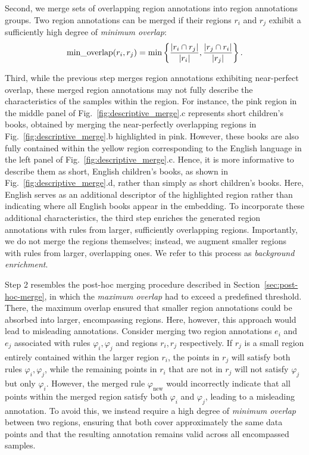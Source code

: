 \documentclass[lettersize,journal]{IEEEtran}
\begin{document}
Second, we merge sets of overlapping region annotations into region annotations groups.
Two region annotations can be merged if their regions $r_i$ and $r_j$ exhibit a sufficiently high degree of \textit{minimum overlap}:
\begin{equation}
\text{min\_overlap}(r_i, r_j) = \min \left \{ \frac{|r_i \cap r_j|}{|r_i|}, \frac{|r_j \cap r_i|}{|r_j|} \right \}. \notag
\end{equation}

Third, while the previous step merges region annotations exhibiting near-perfect overlap, these merged region annotations may not fully describe the characteristics of the samples within the region. For instance, the pink region in the middle panel of Fig.~\ref{fig:descriptive_merge}.c represents short children's books, obtained by merging the near-perfectly overlapping regions in Fig.~\ref{fig:descriptive_merge}.b highlighted in pink. However, these books are also fully contained within the yellow region corresponding to the English language in the left panel of Fig.~\ref{fig:descriptive_merge}.c. Hence, it is more informative to describe them as short, English children's books, as shown in Fig.~\ref{fig:descriptive_merge}.d, rather than simply as short children's books.
Here, English serves as an additional descriptor of the highlighted region rather than indicating where all English books appear in the embedding.
To incorporate these additional characteristics, the third step enriches the generated region annotations with rules from larger, sufficiently overlapping regions.
Importantly, we do not merge the regions themselves; instead, we augment smaller regions with rules from larger, overlapping ones.
We refer to this process as \textit{background enrichment}.

Step 2 resembles the post-hoc merging procedure described in Section~\ref{sec:post-hoc-merge}, in which the \textit{maximum overlap} had to exceed a predefined threshold. There, the maximum overlap ensured that smaller region annotations could be absorbed into larger, encompassing regions. Here, however, this approach would lead to misleading annotations.
Consider merging two region annotations $e_i$ and $e_j$ associated with rules $\varphi_i, \varphi_j$ and regions $r_i, r_j$ respectively.
If $r_j$ is a small region entirely contained within the larger region $r_i$, the points in $r_j$ will satisfy both rules $\varphi_i, \varphi_j$, while the remaining points in $r_i$ that are not in $r_j$ will not satisfy $\varphi_j$ but only $\varphi_i$.
However, the merged rule $\varphi_{\text{new}}$ would incorrectly indicate that all points within the merged region satisfy both $\varphi_i$ and $\varphi_j$, leading to a misleading annotation. To avoid this, we instead require a high degree of \textit{minimum overlap} between two regions, ensuring that both cover approximately the same data points and that the resulting annotation remains valid across all encompassed samples.
\end{document}
